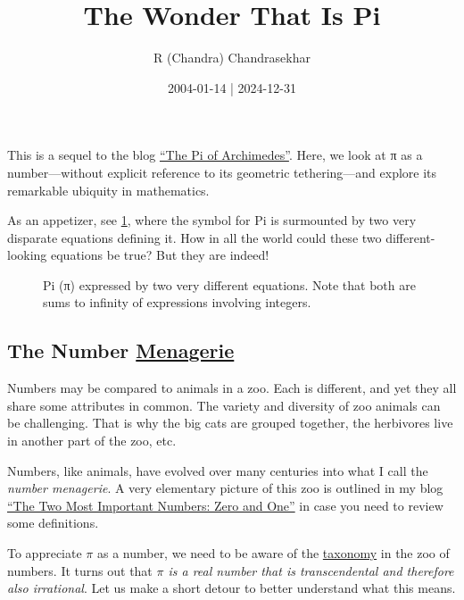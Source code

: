 \documentclass[
  a4paper,
]{article}
\title{The Wonder That Is Pi}
\author{R (Chandra) Chandrasekhar}
\date{2004-01-14 | 2024-12-31}
\begin{document}
\maketitle

\thispagestyle{empty}


This is a sequel to the blog
\href{https://swanlotus.netlify.app/blogs/the-pi-of-archimedes}{``The Pi
of Archimedes''}. Here, we look at π as a number---without explicit
reference to its geometric tethering---and explore its remarkable
ubiquity in mathematics.

As an appetizer, see \cref{fig:pi-equations}, where the symbol for Pi is
surmounted by two very disparate equations defining it. How in all the
world could these two different-looking equations be true? But they are
indeed!

\begin{figure}
\centering

\caption{Pi (π) expressed by two very different equations. Note that
both are sums to infinity of expressions involving
integers.}\label{fig:pi-equations}
\end{figure}

\subsection{\texorpdfstring{The Number
\href{https://www.thefreedictionary.com/menagerie}{Menagerie}}{The Number Menagerie}}\label{the-number-menagerie}

Numbers may be compared to animals in a zoo. Each is different, and yet
they all share some attributes in common. The variety and diversity of
zoo animals can be challenging. That is why the big cats are grouped
together, the herbivores live in another part of the zoo, etc.

Numbers, like animals, have evolved over many centuries into what I call
the \emph{number menagerie}. A very elementary picture of this zoo is
outlined in my blog
\href{https://swanlotus.netlify.app/blogs/the-two-most-important-numbers-zero-and-one}{``The
Two Most Important Numbers: Zero and One''} in case you need to review
some definitions.

To appreciate \(\pi\) as a number, we need to be aware of the
\href{https://www.britannica.com/science/taxonomy}{taxonomy} in the zoo
of numbers. It turns out that \emph{\(\pi\) is a real number that is
transcendental and therefore also irrational}. Let us make a short
detour to better understand what this means.
\end{document}
